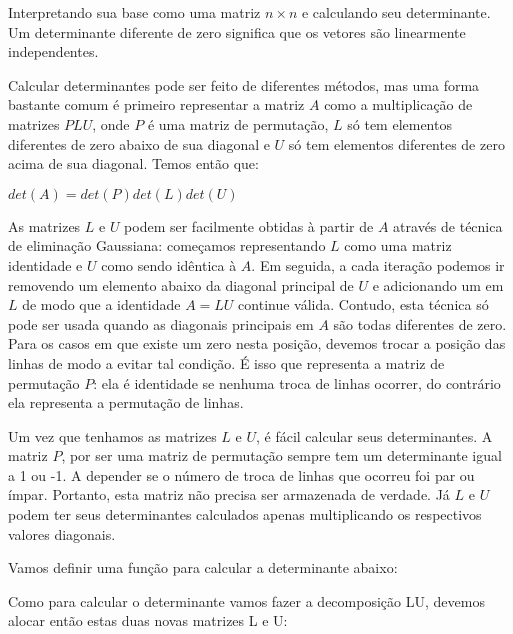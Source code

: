  Interpretando sua base como uma matriz $n\times n$
e calculando seu determinante. Um determinante diferente de zero
significa que os vetores são linearmente independentes.

Calcular determinantes pode ser feito de diferentes métodos, mas uma
forma bastante comum é primeiro representar a matriz $A$ como a
multiplicação de matrizes $PLU$, onde $P$ é uma matriz de permutação,
$L$ só tem elementos diferentes de zero abaixo de sua diagonal e $U$
só tem elementos diferentes de zero acima de sua diagonal. Temos então
que:

$det(A) = det(P)det(L)det(U)$

As matrizes $L$ e $U$ podem ser facilmente obtidas à partir de $A$
através de técnica de eliminação Gaussiana: começamos representando
$L$ como uma matriz identidade e $U$ como sendo idêntica à $A$. Em
seguida, a cada iteração podemos ir removendo um elemento abaixo da
diagonal principal de $U$ e adicionando um em $L$ de modo que a
identidade $A=LU$ continue válida. Contudo, esta técnica só pode ser
usada quando as diagonais principais em $A$ são todas diferentes de
zero. Para os casos em que existe um zero nesta posição, devemos
trocar a posição das linhas de modo a evitar tal condição. É isso que
representa a matriz de permutação $P$: ela é identidade se nenhuma
troca de linhas ocorrer, do contrário ela representa a permutação de
linhas.

Um vez que tenhamos as matrizes $L$ e $U$, é fácil calcular seus
determinantes. A matriz $P$, por ser uma matriz de permutação sempre
tem um determinante igual a 1 ou -1. A depender se o número de troca
de linhas que ocorreu foi par ou ímpar. Portanto, esta matriz não
precisa ser armazenada de verdade. Já $L$ e $U$ podem ter seus
determinantes calculados apenas multiplicando os respectivos valores
diagonais.

Vamos definir uma função para calcular a determinante abaixo:


Como para calcular o determinante vamos fazer a decomposição LU,
devemos alocar então estas duas novas matrizes L e U:



